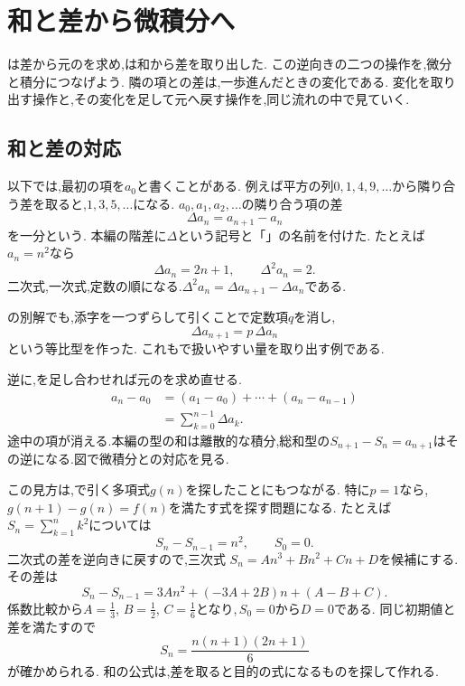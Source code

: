 
\section{和と差から微積分へ}\label{節：差分から始まる離散的な微積分}

は差から元のを求め,は和から差を取り出した.
この逆向きの二つの操作を,微分と積分につなげよう.
隣の項との差は,一歩進んだときの変化である.
変化を取り出す操作と,その変化を足して元へ戻す操作を,同じ流れの中で見ていく.

\subsection{和と差の対応}
以下では,最初の項を$a_0$と書くことがある.
例えば平方の列$0,1,4,9,\ldots$から隣り合う差を取ると,$1,3,5,\ldots$になる.
$a_0,a_1,a_2,\ldots$の隣り合う項の差
\[
  \Delta a_n=a_{n+1}-a_n
\]
を一分という.
本編の階差に$\Delta$という記号と「」の名前を付けた.
たとえば$a_n=n^2$なら
\[
  \Delta a_n=2n+1,\qquad \Delta^2a_n=2.
\]
二次式,一次式,定数の順になる.$\Delta^2a_n=\Delta a_{n+1}-\Delta a_n$である.

の別解でも,添字を一つずらして引くことで定数項$q$を消し,
\[
  \Delta a_{n+1}=p\,\Delta a_n
\]
という等比型を作った.
これもで扱いやすい量を取り出す例である.

逆に,を足し合わせれば元のを求め直せる.
\[
  \begin{aligned}
    a_n-a_0
      &=(a_1-a_0)+\cdots+(a_n-a_{n-1})\\
      &=\sum_{k=0}^{n-1}\Delta a_k.
  \end{aligned}
\]
途中の項が消える.本編の型の和は離散的な積分,総和型の$S_{n+1}-S_n=a_{n+1}$はその逆になる.図で微積分との対応を見る.
  \BookFigDifference

この見方は,で引く多項式$g(n)$を探したことにもつながる.
特に$p=1$なら,\,$g(n+1)-g(n)=f(n)$を満たす式を探す問題になる.
たとえば$S_n=\sum_{k=1}^n k^2$については
\[
  S_n-S_{n-1}=n^2,\qquad S_0=0.
\]
二次式の差を逆向きに戻すので,三次式
$S_n=An^3+Bn^2+Cn+D$を候補にする.
その差は
\[
  S_n-S_{n-1}
  =3An^2+(-3A+2B)n+(A-B+C).
\]
係数比較から$\displaystyle A=\frac{1}{3}$, $\displaystyle B=\frac{1}{2}$, $\displaystyle C=\frac{1}{6}$となり,\,$S_0=0$から$D=0$である.
同じ初期値と差を満たすので
\[
  S_n=\frac{n(n+1)(2n+1)}6
\]
が確かめられる.
和の公式は,差を取ると目的の式になるものを探して作れる.

